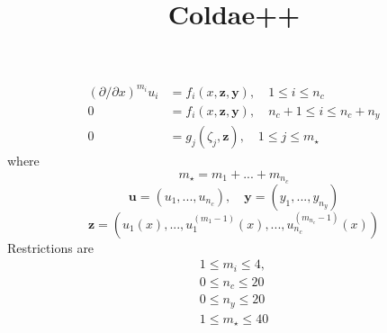 \documentclass[11pt]{article}
\title{Coldae++}
\begin{document}
	\maketitle
	

	\begin{align}
		\left(\partial/\partial x\right)^{m_i} u_i &= f_i(x,\mathbf{z}, \mathbf{y}), \quad 1\leq i \leq n_c\\
		0 &= f_i(x,\mathbf{z}, \mathbf{y}), \quad n_c+1\leq i \leq n_c+n_y\\
		0 &= g_j(\zeta_j, \mathbf{z} ), \quad 1 \leq j \leq m_\star
	\end{align}
	where 
	\begin{equation}\label{key}
		m_\star = m_1+...+m_{n_c}
	\end{equation}
	\begin{equation}\label{key}
		\mathbf{u} = \left(u_1,...,u_{n_c}\right), \quad \mathbf{y} = \left(y_1,...,y_{n_y}\right)
	\end{equation}
	\begin{equation}\label{key}
		\mathbf{z} = \left(u_1(x),...,u_1^{(m_1-1)}(x),...,u_{n_c}^{(m_{n_c}-1)}(x)\right)
	\end{equation}
	Restrictions are
	\begin{align}\label{key}
		1 \leq m_i \leq 4,\\
		0 \leq n_c \leq 20\\
		0 \leq n_y \leq 20\\
		1 \leq m_\star \leq 40
	\end{align}
	
	
	
	
	
\end{document}
